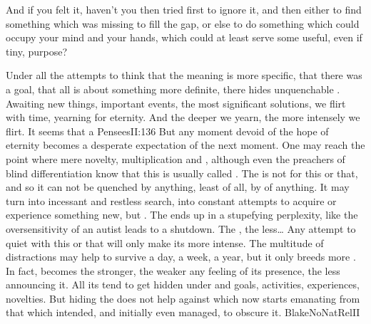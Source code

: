 And if you felt it, haven't you then tried first to ignore it, and then either
to find something which  was missing to fill the gap, or else to do
something which could occupy your mind and your hands, which could at least
serve some useful, even if tiny, purpose?

\pa Under all the attempts to think that the meaning is more specific, that
there was a goal, that all is about something more definite, there hides
unquenchable .  Awaiting new things, important events, the most
significant solutions, we flirt with time, yearning for eternity. And the deeper
we yearn, the more intensely we flirt. It seems that a \citet{mere trifle
  consoles us, for a mere trifle distresses us.}{Pensees}{II:136} But any moment
devoid of the hope of eternity becomes a desperate expectation of the next
moment. One may reach the point where mere novelty, multiplication and
, although even the preachers of
blind differentiation know that
this is usually called .  The  is not for this or that,
and so it can not be quenched by anything, least of all, by  of
anything.  It may turn into incessant and restless search, into constant
attempts to acquire  or experience something new, but . The  ends up in a stupefying perplexity, like the
oversensitivity of an autist leads to a shutdown. The , the less\ldots
Any attempt to quiet  with this or that will only make its  more
intense.  The multitude of distractions may help to survive a day, a week, a
year, but it only breeds more . In fact,  becomes the
stronger, the weaker any feeling of its presence, the less 
announcing it.
All its  tend to get hidden under  and 
goals, activities, experiences, novelties. But hiding the  does not
help against  which now starts emanating from that which intended,
and initially even managed, to obscure it.  \citet{More!  More!  is the cry of a
  mistaken soul, less than All cannot satisfy Man.}{BlakeNoNatRel}{II}
